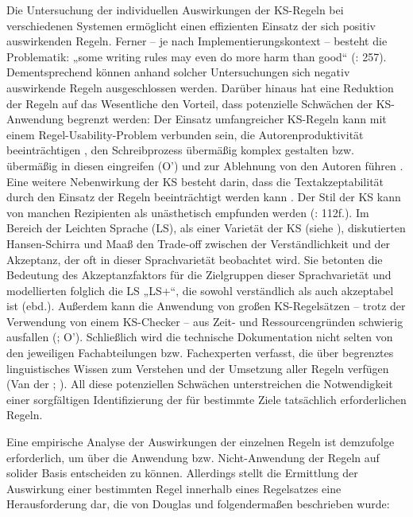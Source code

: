 Die Untersuchung der individuellen Auswirkungen der KS-Regeln bei verschiedenen Systemen ermöglicht einen effizienten Einsatz der sich positiv auswirkenden Regeln. Ferner – je nach Implementierungskontext – besteht die Problematik: „some writing rules may even do more harm than good“ (\citealt{NybergEtAl2003}: 257). Dementsprechend können anhand solcher Untersuchungen sich negativ auswirkende Regeln ausgeschlossen werden. Darüber hinaus hat eine Reduktion der Regeln auf das Wesentliche den Vorteil, dass potenzielle Schwächen der KS-Anwendung begrenzt werden: Der Einsatz umfangreicher KS-Regeln kann mit einem Regel-Usability-Problem verbunden sein, die Autorenproduktivität beeinträchtigen \citep{Mitamura1999}, den Schreibprozess übermäßig komplex gestalten bzw. übermäßig in diesen eingreifen (O’\citealt{BrienRoturier2007}) und zur Ablehnung von den Autoren führen \citep[31]{Doherty2012}. Eine weitere Nebenwirkung der KS besteht darin, dass die Textakzeptabilität durch den Einsatz der Regeln beeinträchtigt werden kann \citep{Roturier2006}. Der Stil der KS kann von manchen Rezipienten als unästhetisch empfunden werden (\citealt{LehrndorferReuther2008}: 112f.). Im Bereich der Leichten Sprache (LS), als einer Varietät der KS (siehe ), diskutierten Hansen-Schirra und Maaß  den Trade-off zwischen der Verständlichkeit und der Akzeptanz, der oft in dieser Sprachvarietät beobachtet wird. Sie betonten die Bedeutung des Akzeptanzfaktors für die Zielgruppen dieser Sprachvarietät und modellierten folglich die LS „LS+“, die sowohl verständlich als auch akzeptabel ist (ebd.). Außerdem kann die Anwendung von großen KS-Regelsätzen – trotz der Verwendung von einem KS-Checker – aus Zeit- und Ressourcengründen schwierig ausfallen (\citealt{Govyaerts1996}; O’\citealt{BrienRoturier2007}). Schließlich wird die technische Dokumentation nicht selten von den jeweiligen Fachabteilungen bzw. Fachexperten verfasst, die über begrenztes linguistisches Wissen zum Verstehen und der Umsetzung aller Regeln verfügen (Van der \citealt{EijkEtAl1996}; \citealt{AranberriRoturier2009}). All diese potenziellen Schwächen unterstreichen die Notwendigkeit einer sorgfältigen Identifizierung der für bestimmte Ziele tatsächlich erforderlichen Regeln.

Eine empirische Analyse der Auswirkungen der einzelnen Regeln ist demzufolge erforderlich, um über die Anwendung bzw. Nicht-Anwendung der Regeln auf solider Basis entscheiden zu können. Allerdings stellt die Ermittlung der Auswirkung einer bestimmten Regel innerhalb eines Regelsatzes eine Herausforderung dar, die von Douglas und \citet[2]{Hurst1996} folgendermaßen beschrieben wurde:

